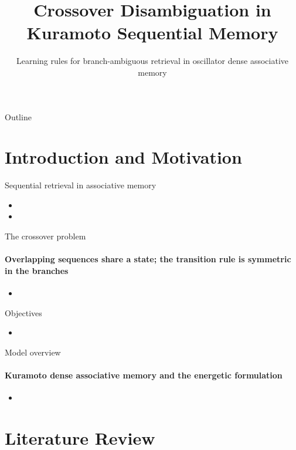 \documentclass[aspectratio=169]{beamer}
\title[Crossover Disambiguation]{Crossover Disambiguation in Kuramoto Sequential Memory}
\subtitle{Learning rules for branch-ambiguous retrieval in oscillator dense associative memory}
\author{}
\institute{}
\date{}
\begin{document}
\begin{frame}
  \titlepage
\end{frame}

\begin{frame}{Outline}
  \tableofcontents
\end{frame}


\section[Introduction]{Introduction and Motivation}

\begin{frame}{Sequential retrieval in associative memory}
  \begin{itemize}
    \item
    \item
  \end{itemize}
\end{frame}

\begin{frame}{The crossover problem}
  \framesubtitle{Overlapping sequences share a state; the transition rule is symmetric in the branches}
  \begin{itemize}
    \item
  \end{itemize}
\end{frame}

\begin{frame}{Objectives}
  \begin{itemize}
    \item
  \end{itemize}
\end{frame}

\begin{frame}{Model overview}
  \framesubtitle{Kuramoto dense associative memory and the energetic formulation}
  \begin{itemize}
    \item
  \end{itemize}
\end{frame}


\section{Literature Review}
\end{document}

